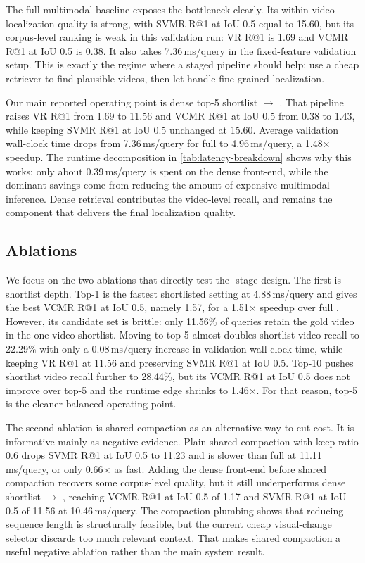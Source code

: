 The full multimodal \xml baseline exposes the bottleneck clearly. Its within-video localization quality is strong, with SVMR R@1 at IoU 0.5 equal to 15.60, but its corpus-level ranking is weak in this validation run: VR R@1 is 1.69 and VCMR R@1 at IoU 0.5 is 0.38. It also takes 7.36\,ms/query in the fixed-feature validation setup. This is exactly the regime where a staged pipeline should help: use a cheap retriever to find plausible videos, then let \xml handle fine-grained localization.

Our main reported operating point is dense top-5 shortlist $\rightarrow$ \xml. That pipeline raises VR R@1 from 1.69 to 11.56 and VCMR R@1 at IoU 0.5 from 0.38 to 1.43, while keeping SVMR R@1 at IoU 0.5 unchanged at 15.60. Average validation wall-clock time drops from 7.36\,ms/query for full \xml to 4.96\,ms/query, a 1.48$\times$ speedup. The runtime decomposition in \cref{tab:latency-breakdown} shows why this works: only about 0.39\,ms/query is spent on the dense front-end, while the dominant savings come from reducing the amount of expensive multimodal inference. Dense retrieval contributes the video-level recall, and \xml remains the component that delivers the final localization quality.

\subsection{Ablations}
We focus on the two ablations that directly test the \xml-stage design. The first is shortlist depth. Top-1 is the fastest shortlisted setting at 4.88\,ms/query and gives the best VCMR R@1 at IoU 0.5, namely 1.57, for a 1.51$\times$ speedup over full \xml. However, its candidate set is brittle: only 11.56\% of queries retain the gold video in the one-video shortlist. Moving to top-5 almost doubles shortlist video recall to 22.29\% with only a 0.08\,ms/query increase in validation wall-clock time, while keeping VR R@1 at 11.56 and preserving SVMR R@1 at IoU 0.5. Top-10 pushes shortlist video recall further to 28.44\%, but its VCMR R@1 at IoU 0.5 does not improve over top-5 and the runtime edge shrinks to 1.46$\times$. For that reason, top-5 is the cleaner balanced operating point.

The second ablation is shared compaction as an alternative way to cut \xml cost. It is informative mainly as negative evidence. Plain shared compaction with keep ratio 0.6 drops SVMR R@1 at IoU 0.5 to 11.23 and is slower than full \xml at 11.11\,ms/query, or only 0.66$\times$ as fast. Adding the dense front-end before shared compaction recovers some corpus-level quality, but it still underperforms dense shortlist $\rightarrow$ \xml, reaching VCMR R@1 at IoU 0.5 of 1.17 and SVMR R@1 at IoU 0.5 of 11.56 at 10.46\,ms/query. The compaction plumbing shows that reducing sequence length is structurally feasible, but the current cheap visual-change selector discards too much relevant context. That makes shared compaction a useful negative ablation rather than the main system result.

